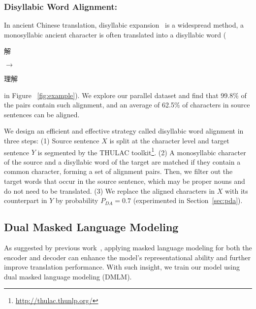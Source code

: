 \subsubsection{Disyllabic Word Alignment:}\label{Disyllabic Align Strategy}
In ancient Chinese translation, disyllabic expansion~\cite{caomiao} is a widespread method, \ie a monosyllabic ancient character is often translated into a disyllabic word (\eg \begin{CJK*}{UTF8}{gbsn}解\end{CJK*} $\rightarrow$ \begin{CJK*}{UTF8}{gbsn}理解\end{CJK*} in Figure%
~\ref{fig:example}). We explore our parallel dataset and find that 99.8\% of the pairs contain such alignment, and an average of 62.5\% of characters in source sentences can be aligned.


We design an efficient and effective strategy called disyllabic word alignment in three steps:
(1) Source sentence $X$ is split at the character level and target sentence $Y$ is segmented by the THULAC toolkit\footnote{\url{http://thulac.thunlp.org/}}.
(2) A monosyllabic character of the source and a disyllabic word of the target are matched if they contain a common character, forming a set of alignment pairs. Then, we filter out the target words that occur in the source sentence, which may be proper nouns and do not need to be translated. 
(3) We replace the aligned characters in $X$ with its counterpart in $Y$ by probability $P_{DA}=0.7$ (experimented in Section~\ref{sec:pda}). 
 





\subsection{Dual Masked Language Modeling}
\label{sec:dmlm}
As suggested by previous work~\cite{DBLP:conf/acl/LiLZWL22}, applying masked language modeling for both the encoder and decoder can enhance the model's representational ability and further improve translation performance. With such insight, we train our model using dual masked language modeling (DMLM). 

